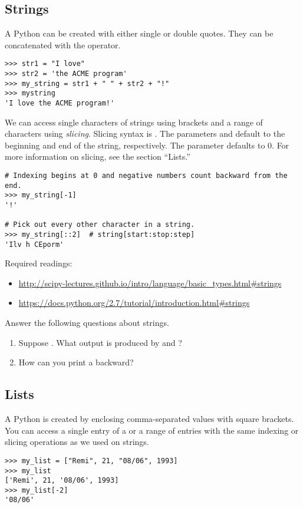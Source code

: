 \subsection*{Strings}
A Python  can be created with either single or double quotes. They can be concatenated with the \li{+} operator.
\begin{lstlisting}
>>> str1 = "I love"
>>> str2 = 'the ACME program'
>>> my_string = str1 + " " + str2 + "!"
>>> mystring
'I love the ACME program!'
\end{lstlisting}

We can access single characters of strings using brackets and a range of characters using \emph{slicing}. Slicing syntax is . The parameters  and  default to the beginning and end of the string, respectively. The parameter  defaults to 0. For more information on slicing, see the section ``Lists.''

\begin{lstlisting}
# Indexing begins at 0 and negative numbers count backward from the end.
>>> my_string[-1]
'!'

# Pick out every other character in a string.
>>> my_string[::2]	# string[start:stop:step]
'Ilv h CEporm'
\end{lstlisting}

Required readings: 
\begin{itemize}
\item \url{http://scipy-lectures.github.io/intro/language/basic_types.html#strings}
\item \url{https://docs.python.org/2.7/tutorial/introduction.html#strings}
\end{itemize}

\begin{problem}
Answer the following questions about strings.
\begin{enumerate}
\item Suppose . What output is produced by  and ? 
\item How can you print a  backward?
\end{enumerate}
\end{problem}


\subsection*{Lists}
A Python  is created by enclosing comma-separated values with square brackets. You can access a single entry of a  or a range of entries with the same indexing or slicing operations as we used on strings. 
\begin{lstlisting}
>>> my_list = ["Remi", 21, "08/06", 1993]
>>> my_list
['Remi', 21, '08/06', 1993]
>>> my_list[-2]
'08/06'
\end{lstlisting}

